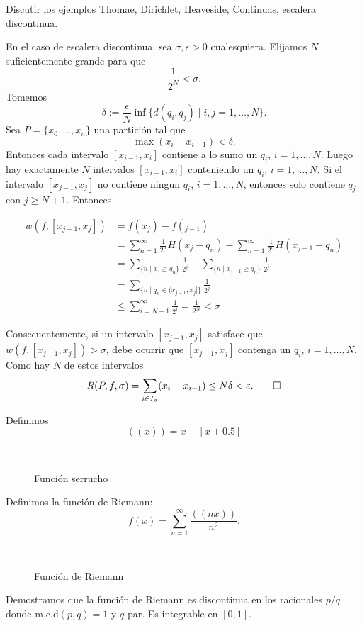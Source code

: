 \begin{ejemplo}{} Discutir los ejemplos Thomae, Dirichlet, Heaveside, Continuas, escalera discontinua.  


En el caso de escalera discontinua, sea $\sigma,\epsilon>0$ cualesquiera.  Elijamos $N$ suficientemente grande para que 
\[\frac{1}{2^N}<\sigma.\]
Tomemos 
\[\delta:=\frac{\epsilon}{N}\inf\{d(q_i,q_j)\mid i,j=1,\ldots , N\}.\]
Sea $P=\{x_0,\ldots, x_n\}$ una partición tal que
\[\max(x_i-x_{i-1})<\delta.\]
Entonces cada intervalo $[x_{i-1},x_i]$ contiene a lo sumo un $q_i$, $i=1,\ldots,N$. Luego hay exactamente $N$ intervalos  $[x_{i-1},x_i]$  conteniendo un $q_i$, $i=1,\ldots,N$.   Si el intervalo $[x_{j-1},x_j]$ no contiene ningun $q_i$, $i=1,\ldots,N$, entonces solo contiene $q_j$ con $j\geq N+1$. Entonces

\[
\begin{split}
 w(f, [x_{j-1},x_j])&=f(x_j)-f(_{j-1})\\
&=\sum_{n=1}^{\infty}\frac{1}{2^n}H(x_j-q_n)-\sum_{n=1}^{\infty}\frac{1}{2^n}H(x_{j-1}-q_n)\\
&=\sum_{\{n\mid x_j\geq q_n\}}\frac{1}{2^j}-\sum_{\{n\mid x_{j-1}\geq q_n\}}\frac{1}{2^j}\\
&=\sum_{\{n\mid q_n\in (x_{j-1}, x_j] \}}\frac{1}{2^j}\\
&\leq \sum_{i=N+1}^\infty \frac{1}{2^i}=\frac{1}{2^N}<\sigma
\end{split}
\]

Consecuentemente, si un intervalo $[x_{j-1},x_j]$ satisface que  $w(f, [x_{j-1},x_j])>\sigma$, debe ocurrir que $[x_{j-1},x_j]$ contenga un  $q_i$, $i=1,\ldots,N$. Como hay $N$ de estos intervalos 
\[
 R(P,f,\sigma)=\sum_{i\in I_{\sigma}}(x_i-x_{i-1})\leq N\delta<\epsilon. \qed
\]
 
\end{ejemplo}

\begin{ejemplo}{} Definimos
\[
 ((x))=x-[x+0.5]
\]

\begin{figure}[H]
\begin{center}
\\
 \caption{Función serrucho}
\end{center}
 \end{figure}


Definimos la función de Riemann:
\[
 f(x)=\sum_{n=1}^{\infty}\frac{((nx))}{n^2}.
\]

\begin{figure}[H]
\begin{center}
\\
\caption{Función de Riemann}
 \end{center}
 \end{figure}
 
Demostramos que la función de Riemann es discontinua en los racionales $p/q$ donde $\text{m.c.d}(p,q)=1$ y $q$ par. Es integrable en $[0,1]$.  
 
\end{ejemplo}


